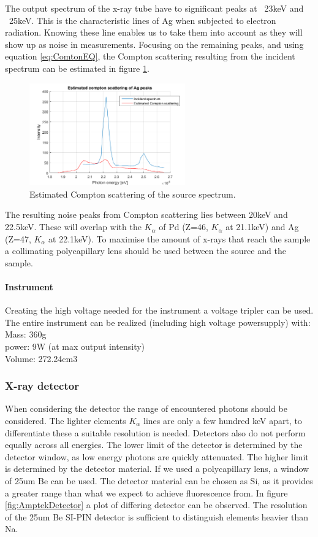 The output spectrum of the x-ray tube have to significant peaks at ~23keV and ~25keV. This is the characteristic lines of Ag when subjected to electron radiation. Knowing these line enables us to take them into account as they will show up as noise in measurements. Focusing on the remaining peaks, and using equation \ref{eq:ComtonEQ}, the Compton scattering resulting from the incident spectrum can be estimated in figure \ref{fig:AgSpectraCompton}.

\begin{figure}[h]
	\centering
	\includegraphics[width=0.6\textwidth]{figures/XRF/estComptonAgPeaks.png}
	\caption{Estimated Compton scattering of the source spectrum.}
	\label{fig:AgSpectraCompton}
\end{figure}

The resulting noise peaks from Compton scattering lies between 20keV and 22.5keV. These will overlap with the $K_\alpha$ of Pd (Z=46, $K_\alpha$ at 21.1keV) and Ag (Z=47, $K_\alpha$ at 22.1keV).
To maximise the amount of x-rays that reach the sample a collimating polycapillary lens should be used between the source and the sample.

\paragraph{Instrument}
Creating the high voltage needed for the instrument a voltage tripler can be used. The entire instrument can be realized (including high voltage powersupply) with\citep{AmptekSource}:\\
Mass: 360g\\
power: 9W (at max output intensity)\\
Volume: 272.24cm3

\subsubsection{X-ray detector}
When considering the detector the range of encountered photons should be considered. The lighter elements $K_\alpha$ lines are only a few hundred keV apart, to differentiate these a suitable resolution is needed. Detectors also do not perform equally across all energies. The lower limit of the detector is determined by the detector window, as low energy photons are quickly attenuated. The higher limit is determined by the detector material. If we used a polycapillary lens, a window of 25um Be can be used. The detector material can be chosen as Si, as it provides a greater range than what we expect to achieve fluorescence from. In figure \ref{fig:AmptekDetector} a plot of differing detector can be observed. The resolution of the 25um Be SI-PIN detector is sufficient to distinguish elements heavier than Na.


